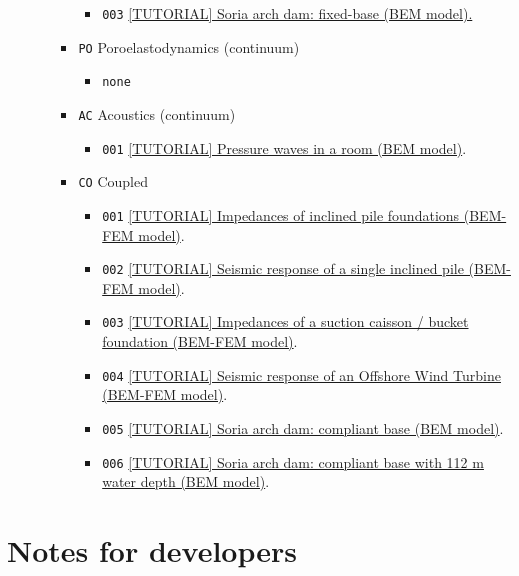 \documentclass{article}
\begin{document}
\begin{itemize}
\begin{itemize}
\begin{itemize}
\begin{itemize}
                \item \texttt{003} \href{ME-TH-EL-003/}{[TUTORIAL] Soria arch dam: fixed-base (BEM model).}
            \end{itemize}            
            \item \texttt{PO} Poroelastodynamics (continuum)
            \begin{itemize}
                \item \texttt{none}
            \end{itemize}                 
            \item \texttt{AC} Acoustics (continuum)
            \begin{itemize}
                \item \texttt{001} \href{ME-TH-AC-001/}{[TUTORIAL] Pressure waves in a room (BEM model)}.
            \end{itemize}             
            \item \texttt{CO} Coupled 
            \begin{itemize}
                \item \texttt{001} \href{ME-TH-CO-001/}{[TUTORIAL] Impedances of inclined pile foundations (BEM-FEM model)}.
                \item \texttt{002} \href{ME-TH-CO-002/}{[TUTORIAL] Seismic response of a single inclined pile (BEM-FEM model)}.
                \item \texttt{003} \href{ME-TH-CO-003/}{[TUTORIAL] Impedances of a suction caisson / bucket foundation (BEM-FEM model)}.
                \item \texttt{004} \href{ME-TH-CO-004/}{[TUTORIAL] Seismic response of an Offshore Wind Turbine (BEM-FEM model)}.
                \item \texttt{005} \href{ME-TH-CO-005/}{[TUTORIAL] Soria arch dam: compliant base (BEM model)}.
                \item \texttt{006} \href{ME-TH-CO-006/}{[TUTORIAL] Soria arch dam: compliant base with 112 m water depth (BEM model)}.
            \end{itemize}                  
        \end{itemize}        
    \end{itemize}    
\end{itemize}

\section{Notes for developers}
\end{document}
